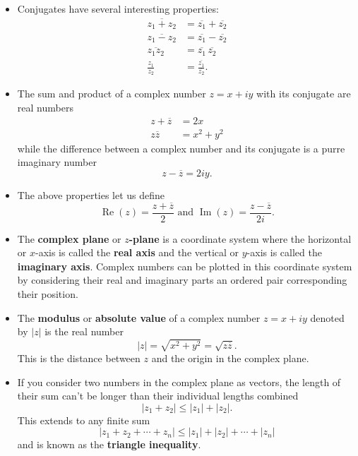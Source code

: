 \documentclass{article}
\renewcommand{\Im}{\operatorname{Im}}
\renewcommand{\Re}{\operatorname{Re}}
\begin{document}
\begin{itemize}
  \item Conjugates have several interesting properties: \begin{align*}
          \overline{z_1 + z_2} & = \overline{z_1} + \overline{z_2}        \\
          \overline{z_1 - z_2} & = \overline{z_1} - \overline{z_2}        \\
          \overline{z_1 z_2}   & = \overline{z_1} \, \overline{z_2}       \\
          \frac{z_1}{z_2}      & = \frac{\overline{z_1}}{\overline{z_2}}.
        \end{align*}

  \item The sum and product of a complex number $z = x + i y$ with its conjugate are real numbers \begin{align*}
          z + \overline{z} & = 2 x       \\
          z \overline{z}   & = x^2 + y^2
        \end{align*} while the difference between a complex number and its conjugate is a purre imaginary number \[z - \overline{z} = 2 i y.\]

  \item The above properties let us define \[\Re(z) = \frac{z + \overline{z}}{2} \text{ and } \Im(z) = \frac{z - \overline{z}}{2 i}.\]

  \item The \textbf{complex plane} or \textbf{$z$-plane} is a coordinate system where the horizontal or $x$-axis is called the \textbf{real axis} and the vertical or $y$-axis is called the \textbf{imaginary axis}. Complex numbers can be plotted in this coordinate system by considering their real and imaginary parts an ordered pair corresponding their position.

  \item The \textbf{modulus} or \textbf{absolute value} of a complex number $z = x + i y$ denoted by $|z|$ is the real number \[|z| = \sqrt{x^2 + y^2} = \sqrt{z \overline{z}}.\] This is the distance between $z$ and the origin in the complex plane.

  \item If you consider two numbers in the complex plane as vectors, the length of their sum can't be longer than their individual lengths combined \[|z_1 + z_2| \le |z_1| + |z_2|.\] This extends to any finite sum \[|z_1 + z_2 + \cdots + z_n| \le |z_1| + |z_2| + \cdots + |z_n|\] and is known as the \textbf{triangle inequality}.
\end{itemize}
\end{document}
